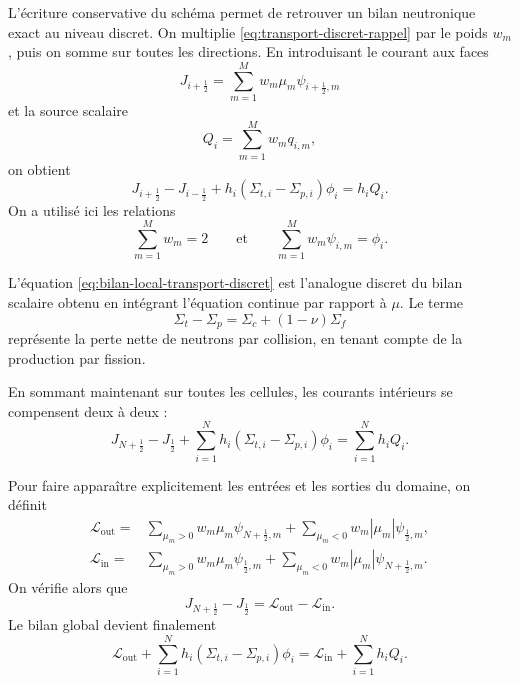 \documentclass{article}
\begin{document}
L'écriture conservative du schéma permet de retrouver un bilan neutronique exact au niveau discret. On multiplie \eqref{eq:transport-discret-rappel} par le poids $w_m$, puis on somme sur toutes les directions. En introduisant le courant aux faces
\begin{equation}
    J_{i+\frac12} = \sum_{m=1}^{M} w_m\mu_m\psi_{i+\frac12,m}
    \label{eq:courant-discret-transport}
\end{equation}
et la source scalaire
\[
    Q_i
    =
    \sum_{m=1}^{M}w_mq_{i,m},
\]
on obtient
\begin{equation}
    J_{i+\frac12} -J_{i-\frac12} + h_i (\Sigma_{t,i}-\Sigma_{p,i}) \phi_i
    = h_iQ_i.
    \label{eq:bilan-local-transport-discret}
\end{equation}
On a utilisé ici les relations
\[
    \sum_{m=1}^{M}w_m=2
    \qquad\text{et}\qquad
    \sum_{m=1}^{M}w_m\psi_{i,m}=\phi_i.
\]

L'équation \eqref{eq:bilan-local-transport-discret} est l'analogue discret du bilan scalaire obtenu en intégrant l'équation continue par rapport à $\mu$. Le terme
\[
    \Sigma_t-\Sigma_p = \Sigma_c+(1-\nu)\Sigma_f
\]
représente la perte nette de neutrons par collision, en tenant compte de la production par fission.

En sommant maintenant sur toutes les cellules, les courants intérieurs se compensent deux à deux :
\begin{equation}
    J_{N+\frac12} - J_{\frac12} 
    + \sum_{i=1}^{N}h_i \left( \Sigma_{t,i}-\Sigma_{p,i} \right) \phi_i 
    =\sum_{i=1}^{N}h_iQ_i.
    \label{eq:bilan-global-transport-discret}
\end{equation}

Pour faire apparaître explicitement les entrées et les sorties du
domaine, on définit
\begin{align*}
    \mathcal L_{\mathrm{out}} ={}& \sum_{\mu_m>0} w_m\mu_m\psi_{N+\frac12,m} +
    \sum_{\mu_m<0} w_m|\mu_m|\psi_{\frac12,m},\\
    \mathcal L_{\mathrm{in}} ={}& \sum_{\mu_m>0} w_m\mu_m\psi_{\frac12,m}
    + \sum_{\mu_m<0} w_m|\mu_m|\psi_{N+\frac12,m}.
\end{align*}
On vérifie alors que
\[
    J_{N+\frac12}-J_{\frac12} = \mathcal L_{\mathrm{out}} - \mathcal L_{\mathrm{in}}.
\]
Le bilan global devient finalement
\begin{equation}
    \boxed{
        \mathcal L_{\mathrm{out}} + \sum_{i=1}^{N} h_i\left( \Sigma_{t,i}-\Sigma_{p,i} \right)\phi_i
        = \mathcal L_{\mathrm{in}} + \sum_{i=1}^{N}h_iQ_i.
    }
    \label{eq:bilan-neutronique-global}
\end{equation}
\end{document}
